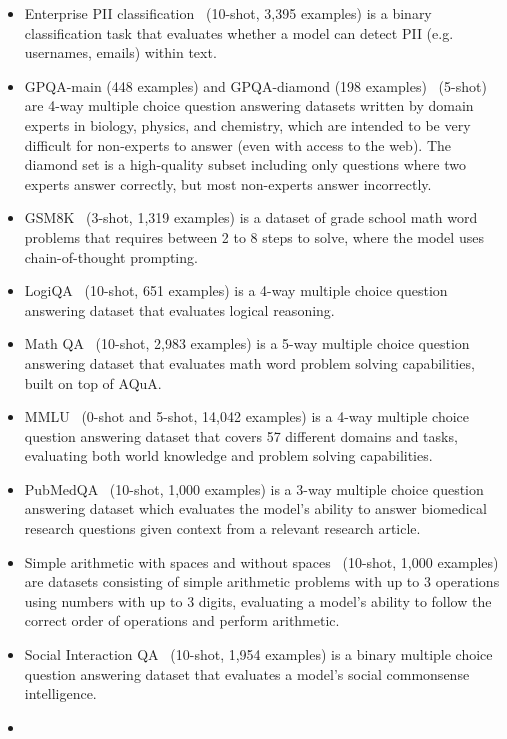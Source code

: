 \documentclass{article}
\begin{document}
\begin{itemize}
    \item
    Enterprise PII classification~\citep{patronusPatronusPatronus} (10-shot, 3,395 examples) is a binary classification task that evaluates whether a model can detect PII (e.g. usernames, emails) within text.
    \item
    GPQA-main (448 examples) and GPQA-diamond (198 examples)~\citep{rein2023gpqa} (5-shot) are 4-way multiple choice question answering datasets written by domain experts in biology, physics, and chemistry, which are intended to be very difficult for non-experts to answer (even with access to the web). The diamond set is a high-quality subset including only questions where two experts answer correctly, but most non-experts answer incorrectly.
    \item
    GSM8K~\citep{gsm8k} (3-shot, 1,319 examples) is a dataset of grade school math word problems that requires between 2 to 8 steps to solve, where the model uses chain-of-thought prompting.
    \item
    LogiQA~\citep{Liu2020LogiQAAC} (10-shot, 651 examples) is a 4-way multiple choice question answering dataset that evaluates logical reasoning.
    \item
    Math QA~\citep{mathqa} (10-shot, 2,983 examples) is a 5-way multiple choice question answering dataset that evaluates math word problem solving capabilities, built on top of AQuA.
    \item
    MMLU~\citep{mmlu} (0-shot and 5-shot, 14,042 examples) is a 4-way multiple choice question answering dataset that covers 57 different domains and tasks, evaluating both world knowledge and problem solving capabilities.
    \item
    PubMedQA~\citep{pubmed} (10-shot, 1,000 examples) is a 3-way multiple choice question answering dataset which evaluates the model's ability to answer biomedical research questions given context from a relevant research article.
    \item
    Simple arithmetic with spaces and without spaces~\citep{mosailMLarithmetic} (10-shot, 1,000 examples) are datasets consisting of simple arithmetic problems with up to 3 operations using numbers with up to 3 digits, evaluating a model's ability to follow the correct order of operations and perform arithmetic.
    \item
    Social Interaction QA~\citep{siqa} (10-shot, 1,954 examples) is a binary multiple choice question answering dataset that evaluates a model's social commonsense intelligence.
    \item

\end{itemize}
\end{document}
